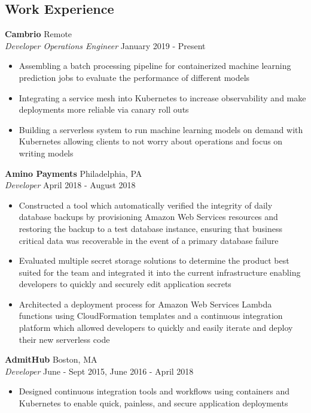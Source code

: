 \documentclass[10pt]{article}
\begin{document}
\begin{flushleft}
\section{Work Experience}
	\textbf{Cambrio} \hfill Remote \\
	\textit{Developer Operations Engineer} \hfill January 2019 - Present \\
	\begin{itemize}
		\item Assembling a batch processing pipeline for containerized machine learning prediction jobs to evaluate the 
			performance of different models
		\item Integrating a service mesh into Kubernetes to increase observability and make deployments more reliable
			via canary roll outs
		\item Building a serverless system to run machine learning models on demand with Kubernetes allowing clients to not worry
			about operations and focus on writing models
	\end{itemize}

	\textbf{Amino Payments} \hfill Philadelphia, PA \\
	\textit{Developer} \hfill April 2018 - August 2018 \\
	\begin{itemize}
		\item Constructed a tool which automatically verified the integrity of daily database backups by provisioning
			Amazon Web Services resources and restoring the backup to a test database instance, ensuring that business 
			critical data was recoverable in the event of a primary database failure

		\item Evaluated multiple secret storage solutions to determine the product best suited for the team and
			integrated it into the current infrastructure enabling developers to quickly and securely edit 
			application secrets

		\item Architected a deployment process for Amazon Web Services Lambda functions using CloudFormation templates
			and a continuous integration platform which allowed developers to quickly and easily iterate and deploy 
			their new serverless code
	\end{itemize}


	\vspace{0.5em}
	\textbf{AdmitHub} \hfill Boston, MA \\
	\textit{Developer} \hfill June - Sept 2015, June 2016 - April 2018 \\
	\begin{itemize}
		\item Designed continuous integration tools and workflows using containers and Kubernetes to enable quick, 
			painless, and secure application deployments


\end{itemize}
\end{flushleft}
\end{document}
